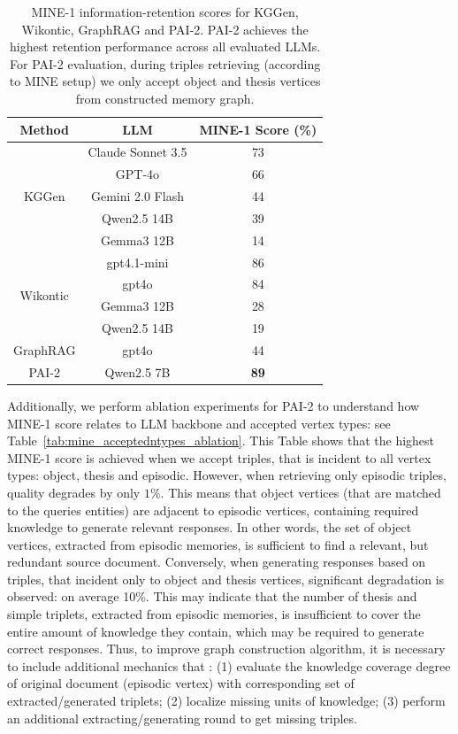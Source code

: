 \begin{table}[H]
    \centering
	\renewcommand{\arraystretch}{1.3}
    \begin{tabular}{|c|c|c|}
    \hline
    \textbf{Method} & \textbf{LLM} & \textbf{MINE-1 Score (\%)} \\ \hline \hline
    \multirow{5}{*}{KGGen} & Claude Sonnet 3.5 & 73 \\ \cline{2-3} 
     & GPT-4o & 66 \\ \cline{2-3} 
     & Gemini 2.0 Flash & 44 \\ \cline{2-3} 
     & Qwen2.5 14B & 39 \\ \cline{2-3} 
     & Gemma3 12B & 14 \\ \hline
    \multirow{4}{*}{Wikontic} & gpt4.1-mini & 86 \\ \cline{2-3} 
     & gpt4o & 84 \\ \cline{2-3} 
     & Gemma3 12B & 28 \\ \cline{2-3} 
     & Qwen2.5 14B & 19 \\ \hline
    GraphRAG & gpt4o & 44 \\ \hline
    PAI-2 & Qwen2.5 7B & \textbf{89} \\ \hline
    \end{tabular}
    \caption{MINE-1 information-retention scores for KGGen, Wikontic, GraphRAG and PAI-2. PAI-2 achieves the highest retention performance across all evaluated LLMs. For PAI-2 evaluation, during triples retrieving (according to MINE setup) we only accept object and thesis vertices from constructed memory graph.}
	\label{tab:mine_comparison}
\end{table}

Additionally, we perform ablation experiments for PAI-2 to understand how MINE-1 score relates to LLM backbone and accepted vertex types: see Table~\ref{tab:mine_acceptedntypes_ablation}. This Table shows that the highest MINE-1 score is achieved when we accept triples, that is incident to all vertex types: object, thesis and episodic. However, when retrieving only episodic triples, quality degrades by only $1\%$. This means that object vertices (that are matched to the queries entities) are adjacent to episodic vertices, containing required knowledge to generate relevant responses. In other words, the set of object vertices, extracted from episodic memories, is sufficient to find a relevant, but redundant source document. Conversely, when generating responses based on triples, that incident only to object and thesis vertices, significant degradation is observed: on average 10\%. This may indicate that the number of thesis and simple triplets, extracted from episodic memories, is insufficient to cover the entire amount of knowledge they contain, which may be required to generate correct responses. Thus, to improve graph construction algorithm, it is necessary to include additional mechanics that : (1) evaluate the knowledge coverage degree of original document (episodic vertex) with corresponding set of extracted/generated triplets; (2) localize missing units of knowledge; (3) perform an additional extracting/generating round to get missing triples.

